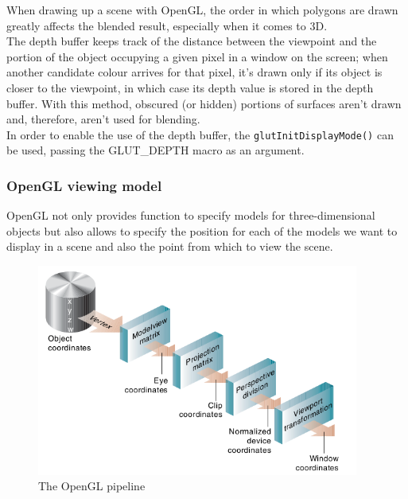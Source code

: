 When drawing up a scene with OpenGL, the order in which polygons are drawn
greatly affects the blended result, especially when it comes to 3D.
\\
The depth buffer keeps track of the distance between the viewpoint and 
the portion of the object occupying a given pixel in a window on the 
screen; when another candidate colour arrives for that pixel, it's drawn 
only if its object is closer to the viewpoint, in which case its depth
value is stored in the depth buffer. With this method, obscured (or hidden)
portions of surfaces aren't drawn and, therefore, aren't used for
blending.
\\
In order to enable the use of the depth buffer, the 
\texttt{glutInitDisplayMode()} can be used, passing the 
GLUT\_DEPTH macro as an argument.

\subsubsection{OpenGL viewing model}
\label{sec:opengl:opengl_note:viewing_model}

OpenGL not only provides function to specify models for 
three-dimensional objects but also allows to specify the 
position for each of the models we want to display in a 
scene and also the point from which to view the scene.

\begin{figure}[!h]
  \begin{center}
    \includegraphics[width=300pt]{img/openGLpipe.png}
    \caption{The OpenGL pipeline}
    \label{fig:openglpipe}
  \end{center}
\end{figure}

